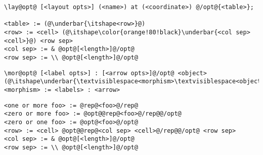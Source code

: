 %
%

\begin{lstlisting}
\lay@opt@ [<layout opts>] (<name>) at (<coordinate>) @/opt@{<table>};

<table> := (@\underbar{\itshape<row>}@)
<row> := <cell> (@\itshape\color{orange!80!black}\underbar{<col sep> <cell>}@) <row sep>
<col sep> := & @opt@[<length>]@/opt@
<row sep> := \\ @opt@[<length>]@/opt@
\end{lstlisting}


\begin{lstlisting}
\mor@opt@ [<label opts>] : [<arrow opts>]@/opt@ <object>(@\itshape\underbar{\textvisiblespace<morphism>\textvisiblespace<object>}@);
<morphism> := <labels> : <arrow>
\end{lstlisting}


\begin{lstlisting}
<one or more foo> := @rep@<foo>@/rep@
<zero or more foo> := @opt@@rep@<foo>@/rep@@/opt@
<zero or one foo> := @opt@<foo>@/opt@
<row> := <cell> @opt@@rep@<col sep> <cell>@/rep@@/opt@ <row sep>
<col sep> := & @opt@[<length>]@/opt@
<row sep> := \\ @opt@[<length>]@/opt@
\end{lstlisting}
